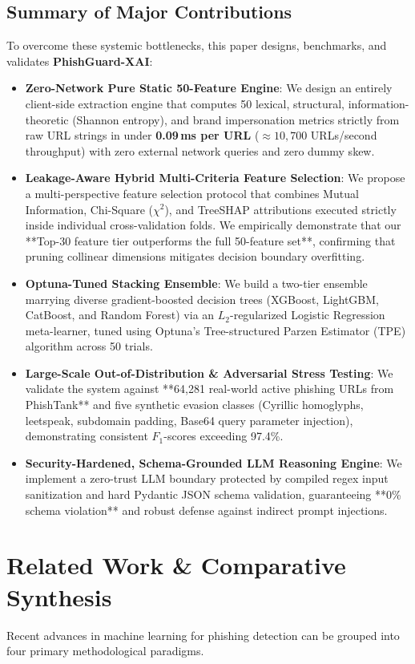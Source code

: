 \documentclass[journal]{IEEEtran}
\begin{document}
\subsection{Summary of Major Contributions}
To overcome these systemic bottlenecks, this paper designs, benchmarks, and validates \textbf{PhishGuard-XAI}:
\begin{itemize}
    \item \textbf{Zero-Network Pure Static 50-Feature Engine}: We design an entirely client-side extraction engine that computes 50 lexical, structural, information-theoretic (Shannon entropy), and brand impersonation metrics strictly from raw URL strings in under \textbf{0.09\,ms per URL} ($\approx 10,700$ URLs/second throughput) with zero external network queries and zero dummy skew.
    \item \textbf{Leakage-Aware Hybrid Multi-Criteria Feature Selection}: We propose a multi-perspective feature selection protocol that combines Mutual Information, Chi-Square ($\chi^2$), and TreeSHAP attributions executed strictly inside individual cross-validation folds. We empirically demonstrate that our **Top-30 feature tier outperforms the full 50-feature set**, confirming that pruning collinear dimensions mitigates decision boundary overfitting.
    \item \textbf{Optuna-Tuned Stacking Ensemble}: We build a two-tier ensemble marrying diverse gradient-boosted decision trees (XGBoost, LightGBM, CatBoost, and Random Forest) via an $L_2$-regularized Logistic Regression meta-learner, tuned using Optuna's Tree-structured Parzen Estimator (TPE) algorithm across 50 trials.
    \item \textbf{Large-Scale Out-of-Distribution \& Adversarial Stress Testing}: We validate the system against **64,281 real-world active phishing URLs from PhishTank** and five synthetic evasion classes (Cyrillic homoglyphs, leetspeak, subdomain padding, Base64 query parameter injection), demonstrating consistent $F_1$-scores exceeding 97.4\%.
    \item \textbf{Security-Hardened, Schema-Grounded LLM Reasoning Engine}: We implement a zero-trust LLM boundary protected by compiled regex input sanitization and hard Pydantic JSON schema validation, guaranteeing **0\% schema violation** and robust defense against indirect prompt injections.
\end{itemize}

\section{Related Work \& Comparative Synthesis}
Recent advances in machine learning for phishing detection can be grouped into four primary methodological paradigms.
\end{document}

